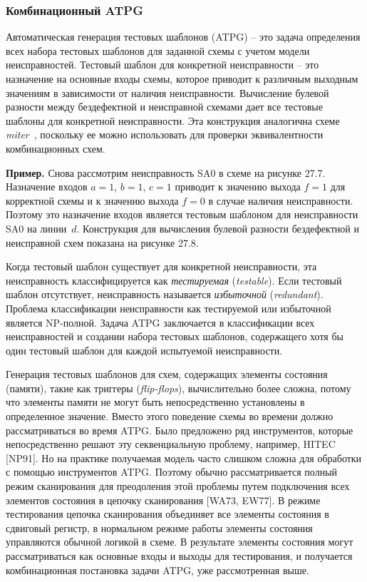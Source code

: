 \subsubsection{Комбинационный ATPG}

Автоматическая генерация тестовых шаблонов (ATPG) \--- это задача определения всех набора тестовых шаблонов для заданной схемы с учетом модели неисправностей.
Тестовый шаблон для конкретной неисправности \--- это назначение на основные входы схемы, которое приводит к различным выходным значениям в зависимости от наличия неисправности.
Вычисление булевой разности между бездефектной и неисправной схемами дает все тестовые шаблоны для конкретной неисправности.
Эта конструкция аналогична схеме \textit{miter}~\cite{brand1983}, поскольку ее можно использовать для проверки эквивалентности комбинационных схем.

\textbf{Пример.}
Снова рассмотрим неисправность SA0 в схеме на рисунке 27.7.
Назначение входов $a = 1$, $b = 1$, $c = 1$ приводит к значению выхода $f = 1$ для корректной схемы и к значению выхода $f = 0$ в случае наличия неисправности.
Поэтому это назначение входов является тестовым шаблоном для неисправности SA0 на линии~$d$.
Конструкция для вычисления булевой разности бездефектной и неисправной схем показана на рисунке 27.8.

Когда тестовый шаблон существует для конкретной неисправности, эта неисправность классифицируется как \textit{тестируемая} (\textit{testable}).
Если тестовый шаблон отсутствует, неисправность называется \textit{избыточной} (\textit{redundant}).
Проблема классификации неисправности как тестируемой или избыточной является NP-полной.
Задача ATPG заключается в классификации всех неисправностей и создании набора тестовых шаблонов, содержащего хотя бы один тестовый шаблон для каждой испытуемой неисправности.


Генерация тестовых шаблонов для схем, содержащих элементы состояния (памяти), такие как триггеры (\textit{flip-flops}), вычислительно более сложна, потому что элементы памяти не могут быть непосредственно установлены в определенное значение.
Вместо этого поведение схемы во времени должно рассматриваться во время ATPG.
Было предложено ряд инструментов, которые непосредственно решают эту секвенциальную проблему, например, HITEC [NP91].
Но на практике получаемая модель часто слишком сложна для обработки с помощью инструментов ATPG.
Поэтому обычно рассматривается полный режим сканирования для преодоления этой проблемы путем подключения всех элементов состояния в цепочку сканирования [WA73, EW77].
В режиме тестирования цепочка сканирования объединяет все элементы состояния в сдвиговый регистр, в нормальном режиме работы элементы состояния управляются обычной логикой в схеме.
В результате элементы состояния могут рассматриваться как основные входы и выходы для тестирования, и получается комбинационная постановка задачи ATPG, уже рассмотренная выше.

